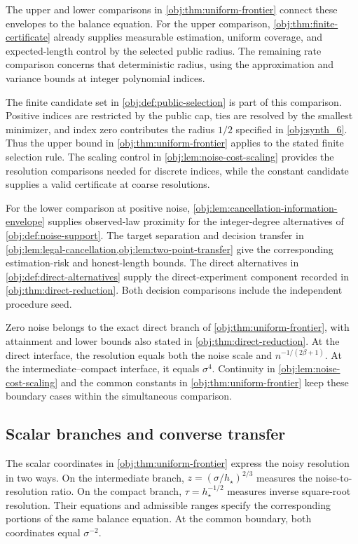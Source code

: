 The upper and lower comparisons in \cref{obj:thm:uniform-frontier} connect these envelopes to the balance equation. For the upper comparison, \cref{obj:thm:finite-certificate} already supplies measurable estimation, uniform coverage, and expected-length control by the selected public radius. The remaining rate comparison concerns that deterministic radius, using the approximation and variance bounds at integer polynomial indices.

The finite candidate set in \cref{obj:def:public-selection} is part of this comparison. Positive indices are restricted by the public cap, ties are resolved by the smallest minimizer, and index zero contributes the radius \(1/2\) specified in \cref{obj:synth_6}. Thus the upper bound in \cref{obj:thm:uniform-frontier} applies to the stated finite selection rule. The scaling control in \cref{obj:lem:noise-cost-scaling} provides the resolution comparisons needed for discrete indices, while the constant candidate supplies a valid certificate at coarse resolutions.

For the lower comparison at positive noise, \cref{obj:lem:cancellation-information-envelope} supplies observed-law proximity for the integer-degree alternatives of \cref{obj:def:noise-support}. The target separation and decision transfer in \cref{obj:lem:legal-cancellation,obj:lem:two-point-transfer} give the corresponding estimation-risk and honest-length bounds. The direct alternatives in \cref{obj:def:direct-alternatives} supply the direct-experiment component recorded in \cref{obj:thm:direct-reduction}. Both decision comparisons include the independent procedure seed.

Zero noise belongs to the exact direct branch of \cref{obj:thm:uniform-frontier}, with attainment and lower bounds also stated in \cref{obj:thm:direct-reduction}. At the direct interface, the resolution equals both the noise scale and \(n^{-1/(2\beta+1)}\). At the intermediate--compact interface, it equals \(\sigma^4\). Continuity in \cref{obj:lem:noise-cost-scaling} and the common constants in \cref{obj:thm:uniform-frontier} keep these boundary cases within the simultaneous comparison.

\subsection{Scalar branches and converse transfer}

The scalar coordinates in \cref{obj:thm:uniform-frontier} express the noisy resolution in two ways. On the intermediate branch, \(z=(\sigma/h_\star)^{2/3}\) measures the noise-to-resolution ratio. On the compact branch, \(\tau=h_\star^{-1/2}\) measures inverse square-root resolution. Their equations and admissible ranges specify the corresponding portions of the same balance equation. At the common boundary, both coordinates equal \(\sigma^{-2}\).

